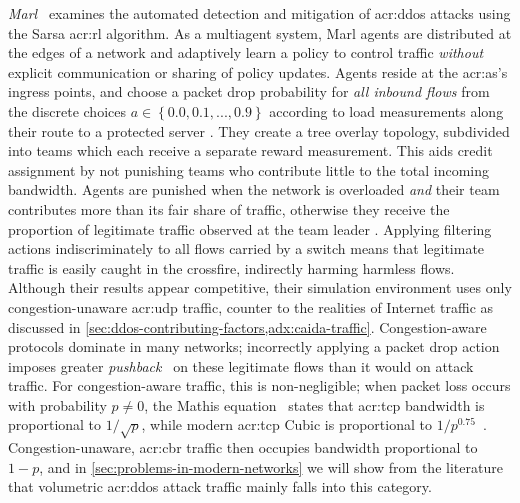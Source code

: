 \emph{Marl}~\parencite{DBLP:conf/iaai/MalialisK13,DBLP:journals/eaai/MalialisK15} examines the automated detection and mitigation of \gls{acr:ddos} attacks using the Sarsa \gls{acr:rl} algorithm.
As a multiagent system, Marl agents are distributed at the edges of a network and adaptively learn a policy to control traffic \emph{without} explicit communication or sharing of policy updates.
Agents reside at the \gls{acr:as}'s ingress points, and choose a packet drop probability for \emph{all inbound flows} from the discrete choices $a\in\left\{0.0,0.1,...,0.9\right\}$ \prllitact{} according to load measurements along their route to a protected server \prllitstate.
They create a tree overlay topology, subdivided into teams which each receive a separate reward measurement.
This aids credit assignment by not punishing teams who contribute little to the total incoming bandwidth.
Agents are punished when the network is overloaded \emph{and} their team contributes more than its fair share of traffic, otherwise they receive the proportion of legitimate traffic observed at the team leader \prllitreward.
Applying filtering actions indiscriminately to all flows carried by a switch means that legitimate traffic is easily caught in the crossfire, indirectly harming harmless flows.
Although their results appear competitive, their simulation environment uses only congestion-unaware \gls{acr:udp} traffic, counter to the realities of Internet traffic as discussed in \cref{sec:ddos-contributing-factors,adx:caida-traffic}.
Congestion-aware protocols dominate in many networks; incorrectly applying a packet drop action imposes greater \emph{pushback}~\parencite{DBLP:journals/ccr/MahajanBFIPS02a} on these legitimate flows than it would on attack traffic.
For congestion-aware traffic, this is non-negligible; when packet loss occurs with probability $p\ne0$, the Mathis equation~\parencite{DBLP:journals/ccr/MathisSMO97} states that \gls{acr:tcp} bandwidth is proportional to $1/\sqrt{p}$, while modern \gls{acr:tcp} Cubic is proportional to $1/p^{0.75}$~\parencite{rfc8312}.
Congestion-unaware, \gls{acr:cbr} traffic then occupies bandwidth proportional to $1 - p$, and in \cref{sec:problems-in-modern-networks} we will show from the literature that volumetric \gls{acr:ddos} attack traffic mainly falls into this category.
